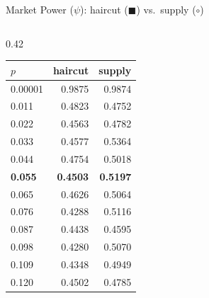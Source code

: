 \documentclass[aspectratio=169,10pt]{beamer}
\begin{document}
\begin{frame}{Market Power ($\psi$): haircut ($\blacksquare$) vs.\ supply ($\circ$)}
\begin{columns}[T]
\begin{column}{0.42\textwidth}
\begin{tabular}{lrr}
        \toprule
        $p$ & haircut & supply \\
        \midrule
        0.00001 & 0.9875 & 0.9874 \\
        0.011 & 0.4823 & 0.4752 \\
        0.022 & 0.4563 & 0.4782 \\
        0.033 & 0.4577 & 0.5364 \\
        0.044 & 0.4754 & 0.5018 \\
        \textbf{0.055} & \textbf{0.4503} & \textbf{0.5197} \\
        0.065 & 0.4626 & 0.5064 \\
        0.076 & 0.4288 & 0.5116 \\
        0.087 & 0.4438 & 0.4595 \\
        0.098 & 0.4280 & 0.5070 \\
        0.109 & 0.4348 & 0.4949 \\
        0.120 & 0.4502 & 0.4785 \\
        \bottomrule
      \end{tabular}
    \end{column}
  \end{columns}
\end{frame}
\end{document}
